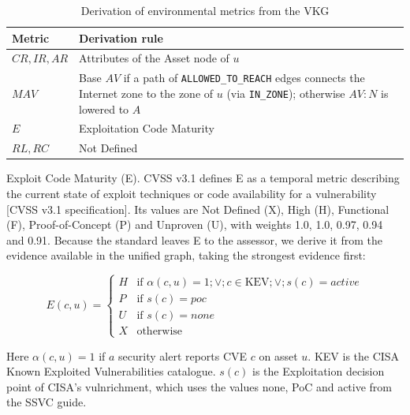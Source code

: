 \documentclass[conference]{IEEEtran}
\begin{document}
\begin{itemize}
    \begin{table}[h]
    \centering
    \caption{Derivation of environmental metrics from the VKG}
    \label{tab:metrics}
    \begin{tabular}{p{1.4cm}p{6cm}}
    \hline
    Metric & Derivation rule \\
    \hline
    $CR, IR, AR$ & Attributes of the Asset node of $u$ \\
    $MAV$ & Base $AV$ if a path of \texttt{ALLOWED\_TO\_REACH} edges
            connects the Internet zone to the zone of $u$
            (via \texttt{IN\_ZONE}); otherwise $AV{:}N$ is lowered to $A$ \\
    $E$ & Exploitation Code Maturity \\
    $RL, RC$ & Not Defined \\
    \hline
    \end{tabular}
    \end{table}

    Exploit Code Maturity (E). CVSS v3.1 defines E as a temporal metric describing the current state of exploit techniques or code availability for a vulnerability [CVSS v3.1 specification]. Its values are Not Defined (X), High (H), Functional (F), Proof-of-Concept (P) and Unproven (U), with weights 1.0, 1.0, 0.97, 0.94 and 0.91. Because the standard leaves E to the assessor, we derive it from the evidence available in the unified graph, taking the strongest evidence first:

    \begin{equation}
    E(c,u)=\begin{cases}
    H & \text{if } \alpha(c,u)=1 ;\lor; c\in \mathrm{KEV} ;\lor; s(c)=\textit{active}\\
    P & \text{if } s(c)=\textit{poc}\\
    U & \text{if } s(c)=\textit{none}\\
    X & \text{otherwise}
    \end{cases}
    \end{equation}
    
    Here $\alpha(c,u)=1$ if $a$ security alert reports CVE $c$ on asset $u$. KEV is the CISA Known Exploited Vulnerabilities catalogue. $s(c)$ is the Exploitation decision point of CISA's vulnrichment, which uses the values none, PoC and active from the SSVC guide.
    

\end{itemize}
\end{document}
